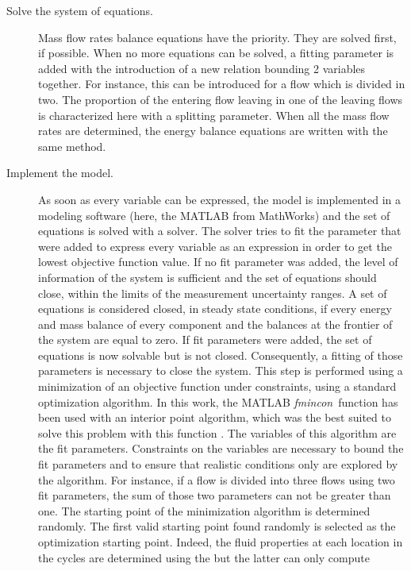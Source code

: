 \begin{description}
\item[Solve the system of equations.] Mass flow rates balance
  equations have the priority. They are solved first, if
  possible. When no more equations can be solved, a fitting parameter
  is added with the introduction of a new relation bounding 2
  variables together. For instance, this can be introduced for a flow
  which is divided in two. The proportion of the entering flow leaving
  in one of the leaving flows is characterized here with a splitting
  parameter. When all the mass flow rates are determined, the energy
  balance equations are written with the same method.

\item[Implement the model.] As soon as every variable can be
  expressed, the model is implemented in a modeling software (here,
  the MATLAB from MathWorks) and the set of equations is solved with a
  solver. The solver tries to fit the parameter that were added to
  express every variable as an expression in order to get the lowest
  objective function value. If no fit parameter was added, the level
  of information of the system is sufficient and the set of equations
  should close, within the limits of the measurement uncertainty
  ranges. A set of equations is considered closed, in steady state
  conditions, if every energy and mass balance of every component and
  the balances at the frontier of the system are equal to zero. If fit
  parameters were added, the set of equations is now solvable but is
  not closed. Consequently, a fitting of those parameters is necessary
  to close the system. This step is performed using a minimization of
  an objective function under constraints, using a standard
  optimization algorithm. In this work, the MATLAB
  \textit{fmincon}\,\citep{fmincon2014a} function has been used with
  an interior point algorithm, which was the best suited to solve this
  problem with this function \citep{fmincon2014a-interiorpoint}. The
  variables of this algorithm are the fit parameters. Constraints on
  the variables are necessary to bound the fit parameters and to
  ensure that realistic conditions only are explored by the
  algorithm. For instance, if a flow is divided into three flows using
  two fit parameters, the sum of those two parameters can not be
  greater than one. The starting point of the minimization algorithm
  is determined randomly. The first valid starting point found
  randomly is selected as the optimization starting point. Indeed, the
  fluid properties at each location in the cycles are determined using
  the \REFPROP{} \citep{REFPROP90} but the latter can only compute

\end{description}
